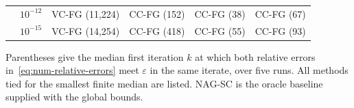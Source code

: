 \begin{table}[H]
\begin{tabular}{@{}llcccc@{}}
 & $10^{-12}$ & VC-FG (11,224) & CC-FG (152) & CC-FG (38) & CC-FG (67) \\
 & $10^{-15}$ & VC-FG (14,254) & CC-FG (418) & CC-FG (55) & CC-FG (93) \\
\bottomrule
\end{tabular}
\par\smallskip
\begin{minipage}{.79\linewidth}\footnotesize Parentheses give the median first iteration $k$ at which both relative errors in~\eqref{eq:num-relative-errors} meet $\varepsilon$ in the same iterate, over five runs. All methods tied for the smallest finite median are listed. NAG-SC is the oracle baseline supplied with the global bounds.\end{minipage}
\end{table}

